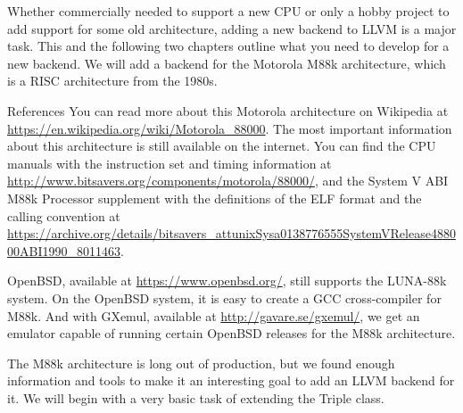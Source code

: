 Whether commercially needed to support a new CPU or only a hobby project to add support for some old architecture, adding a new backend to LLVM is a major task. This and the following two chapters outline what you need to develop for a new backend. We will add a backend for the Motorola M88k architecture, which is a RISC architecture from the 1980s.

\begin{myTip}{References}
You can read more about this Motorola architecture on Wikipedia at \url{https://en.wikipedia.org/wiki/Motorola_88000}. The most important information about this architecture is still available on the internet. You can find the CPU manuals with the instruction set and timing information at \url{http://www.bitsavers.org/components/motorola/88000/}, and the System V ABI M88k Processor supplement with the definitions of the ELF format and the calling convention at \url{https://archive.org/details/bitsavers_attunixSysa0138776555SystemVRelease488000ABI1990_8011463}.

OpenBSD, available at \url{https://www.openbsd.org/}, still supports the LUNA-88k system. On the OpenBSD system, it is easy to create a GCC cross-compiler for M88k. And with GXemul, available at \url{http://gavare.se/gxemul/}, we get an emulator capable of running certain OpenBSD releases for the M88k architecture.
\end{myTip}

The M88k architecture is long out of production, but we found enough information and tools to make it an interesting goal to add an LLVM backend for it. We will begin with a very basic task of extending the Triple class.











